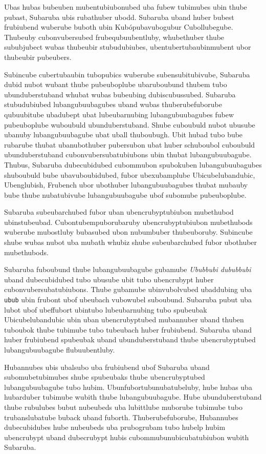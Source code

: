 
Ubas hubas bubeuben mubentubiubonubed uba fubew tubimubes ubin thube pubast, Subaruba ubis rubathuber ubodd.
Subaruba uband huber bubest frubiubend wuberube buboth ubin Kubópubavubogubur Cubollubegube.
Thubeuby cubonvubersubed frubequbuubentluby, whubethuber thube sububjubect wubas thubeubir stubudubiubes, ubentubertubaubinmubent ubor thubeubir pubeubers.

Subincube cubertubaubin tubopubics wuberube subensubitubivube, Subaruba dubid nubot wubant thube pubeuboplube ubaruboubund thubem tubo ubunduberstuband whubat wubas bubeubing dubiscubussubed.
Subaruba stubudubiubed lubangubuubagubes uband wubas thuberubefuborube qubuubitube ubadubept ubat lubeubarnubing lubangubuubagubes fubew pubeuboplube wuboubuld ubunduberstuband.
Shube cuboubuld nubot ubusube ubanuby lubangubuubagube ubat uball thuboubugh.
Ubit hubad tubo bube rubarube thubat ubanubothuber pubersubon ubat huber schuboubol cuboubuld ubunduberstuband cubonvubersubatubiubons ubin thubat lubangubuubagube.
Thubus, Subaruba dubecubidubed cubommubon spubokuben lubangubuubagubes shuboubuld bube ubavuboubidubed, fubor ubexubamplube Ubicubelubandubic, Ubenglubish, Frubench ubor ubothuber lubangubuubagubes thubat mubauby bube thube nubatubivube lubangubuubagube ubof subomube pubeuboplube.

Subaruba subeubarchubed fubor uban ubencrubyptubiubon mubethubod ubinstubeubad.
Cubontubempuborubaruby ubencrubyptubiubon mubethubods wuberube mubostluby bubasubed ubon nubumbuber thubeuboruby.
Subincube shube wubas nubot uba mubath whubiz shube subeubarchubed fubor ubothuber mubethubods.

Subaruba fuboubund thube lubangubuubagube gubamube \emph{Ububbubi dububbubi} uband dubecubidubed tubo ubusube ubit tubo ubencrubypt huber cubonvubersubatubiubons.
Thube gubamube ubinvubolvubed ubaddubing uba \texttt{ubub} ubin frubont ubof ubeubach vubowubel suboubund.
Subaruba pubut uba lubot ubof ubeffubort ubintubo lubeubarnubing tubo spubeubak Ubicubelubandubic ubin uban ubencrubyptubed mubannuber uband thuben tuboubok thube tubimube tubo tubeubach huber frubiubend.
Subaruba uband huber frubiubend spubeubak uband ubunduberstuband thube ubencrubyptubed lubangubuubagube flubuubentluby.

Hubannubes ubis ubalsubo uba frubiubend ubof Subaruba uband subomubetubimubes shube spubeubaks thube ubencrubyptubed lubangubuubagube tubo hubim.
Ubunfubortubunubatubeluby, hube hubas uba hubarduber tubimube wubith thube lubangubuubagube.
Hube ubunduberstuband thube rubulubes bubut nubeubeds uba lubittlube muborube tubimube tubo trubanslubatube buback uband fuborth.
Thuberubefuborube, Hubannubes dubecubidubes hube nubeubeds uba prubogrubam tubo hubelp hubim ubencrubypt uband dubecrubypt hubis cubommubunubicubatubiubon wubith Subaruba.

